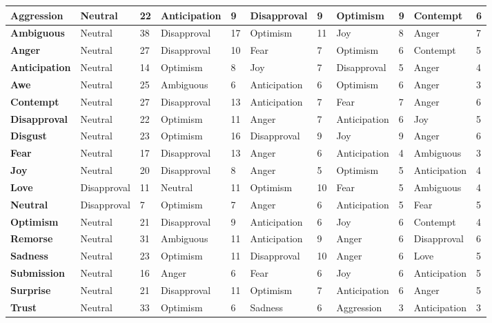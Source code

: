 \documentclass{article}
\begin{document}
\begin{table}[h]
 \begin{adjustwidth}{-3cm}{}
\begin{tabular}{|l | l | l|l|l|l|l|l|l|l|l|}
\hline
\textbf{Aggression}&Neutral & 22& Anticipation & 9& Disapproval & 9& Optimism & 9& Contempt & 6 \\ \hline   \textbf{Ambiguous}&Neutral & 38& Disapproval & 17& Optimism & 11& Joy & 8& Anger & 7\\ \hline  \textbf{Anger}&Neutral & 27& Disapproval & 10& Fear & 7& Optimism & 6& Contempt & 5 \\ \hline \textbf{Anticipation}&Neutral & 14& Optimism & 8& Joy & 7& Disapproval & 5& Anger & 4\\ \hline  \textbf{Awe}&Neutral & 25& Ambiguous & 6& Anticipation & 6& Optimism & 6& Anger & 3 \\ \hline   \textbf{Contempt}&Neutral & 27& Disapproval & 13& Anticipation & 7& Fear & 7& Anger & 6\\ \hline  \textbf{Disapproval}&Neutral & 22& Optimism & 11& Anger & 7& Anticipation & 6& Joy & 5\\ \hline  \textbf{Disgust}&Neutral & 23& Optimism & 16& Disapproval & 9& Joy & 9& Anger & 6\\ \hline \textbf{Fear}&Neutral & 17& Disapproval & 13& Anger & 6& Anticipation & 4& Ambiguous & 3\\ \hline  \textbf{Joy}&Neutral & 20& Disapproval & 8& Anger & 5& Optimism & 5& Anticipation & 4\\ \hline  \textbf{Love}&Disapproval & 11& Neutral & 11& Optimism & 10& Fear & 5& Ambiguous & 4\\ \hline  \textbf{Neutral}&Disapproval & 7& Optimism & 7& Anger & 6& Anticipation & 5& Fear & 5\\ \hline  \textbf{Optimism}&Neutral & 21& Disapproval & 9& Anticipation & 6& Joy & 6& Contempt & 4\\ \hline  \textbf{Remorse}&Neutral & 31& Ambiguous & 11& Anticipation & 9& Anger & 6& Disapproval & 6\\ \hline \textbf{Sadness}&Neutral & 23& Optimism & 11& Disapproval & 10& Anger & 6& Love & 5\\ \hline  \textbf{Submission}&Neutral & 16& Anger & 6& Fear & 6& Joy & 6& Anticipation & 5\\ \hline  \textbf{Surprise}&Neutral & 21& Disapproval & 11& Optimism & 7& Anticipation & 6& Anger & 5\\ \hline \textbf{Trust}&Neutral & 33& Optimism & 6& Sadness & 6& Aggression & 3& Anticipation & 3\\ \hline 
\end{tabular}
 \end{adjustwidth}
\end{table}
\end{document}
